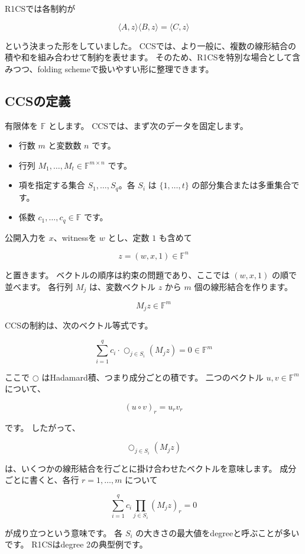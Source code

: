 \documentclass[a4paper,11pt]{ltjsarticle}
\newcommand{\F}{\mathbb{F}}
\begin{document}
R1CSでは各制約が

\[
  \langle A,z\rangle\langle B,z\rangle=\langle C,z\rangle
\]

という決まった形をしていました。
CCSでは、より一般に、複数の線形結合の積や和を組み合わせて制約を表せます。
そのため、R1CSを特別な場合として含みつつ、folding schemeで扱いやすい形に整理できます。

\subsection{CCSの定義}

有限体を \(\F\) とします。
CCSでは、まず次のデータを固定します。

\begin{itemize}
  \item 行数 \(m\) と変数数 \(n\) です。
  \item 行列 \(M_1,\ldots,M_t\in\F^{m\times n}\) です。
  \item 項を指定する集合 \(S_1,\ldots,S_q\)。各 \(S_i\) は \(\{1,\ldots,t\}\) の部分集合または多重集合です。
  \item 係数 \(c_1,\ldots,c_q\in\F\) です。
\end{itemize}

公開入力を \(x\)、witnessを \(w\) とし、定数 \(1\) も含めて

\[
  z=(w,x,1)\in\F^n
\]

と置きます。
ベクトルの順序は約束の問題であり、ここでは \((w,x,1)\) の順で並べます。
各行列 \(M_j\) は、変数ベクトル \(z\) から \(m\) 個の線形結合を作ります。

\[
  M_jz\in\F^m
\]

CCSの制約は、次のベクトル等式です。

\[
  \sum_{i=1}^{q}
  c_i\cdot
  \bigcirc_{j\in S_i}(M_jz)
  =
  0\in\F^m
\]

ここで \(\bigcirc\) はHadamard積、つまり成分ごとの積です。
二つのベクトル \(u,v\in\F^m\) について、

\[
  (u\circ v)_r=u_rv_r
\]

です。
したがって、

\[
  \bigcirc_{j\in S_i}(M_jz)
\]

は、いくつかの線形結合を行ごとに掛け合わせたベクトルを意味します。
成分ごとに書くと、各行 \(r=1,\ldots,m\) について

\[
  \sum_{i=1}^{q}
  c_i
  \prod_{j\in S_i}(M_jz)_r
  =
  0
\]

が成り立つという意味です。
各 \(S_i\) の大きさの最大値をdegreeと呼ぶことが多いです。
R1CSはdegree 2の典型例です。
\end{document}
